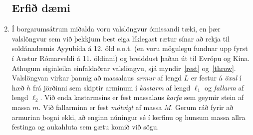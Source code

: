 \begin{enumerate}[label = \textbf{Dæmi \thechapter.\arabic*.}]
\newpage


\subsection*{Erfið dæmi}


\item Í borgarumsátrum miðalda voru valslöngvur ómissandi tæki, en þær valslöngvur sem við þekkjum best eiga líklegast rætur sínar að rekja til soldánadæmis Ayyubída á 12. öld e.o.t. (en voru mögulegu fundnar upp fyrst í Austur Rómarveldi á 11. öldinni) og breiddust þaðan út til Evrópu og Kína.
Athugum eiginleika einfaldaðrar valslöngvu, sjá myndir~\ref{rest} og~\ref{throw}.
Valslöngvan virkar þannig að massalaus \textit{armur} af lengd \(L\) er festur á \textit{öxul} í hæð \(h\) frá jörðinni sem skiptir arminum í \textit{kastarm} af lengd \(\ell_1\) og \textit{fallarm} af lengd \(\ell_2\).
Við enda kastarmsins er fest massalaus \textit{karfa} sem geymir stein af massa \(m\).
Við fallarminn er fest \textit{mótvigt} af massa \(M\).
Gerum ráð fyrir að armurinn bogni ekki, að enginn núningur sé í kerfinu og hunsum massa allra festinga og aukahluta sem gætu komið við sögu.


\end{enumerate}
